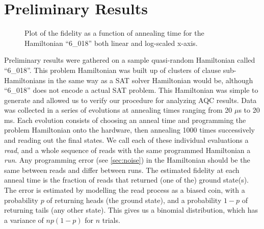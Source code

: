 \chapter{Preliminary Results}
\label{chap:prelim}

\begin{figure}
	\caption[Fidelity vs Time]{Plot of the fidelity as a function of annealing time for the Hamiltonian ``6\_018'' both linear and log-scaled x-axis.}
	\label{fig:fidelity}
\end{figure}

Preliminary results were gathered on a sample quasi-random Hamiltonian called ``6\_018''.  This problem Hamiltonian was built up of clusters of clause sub-Hamiltonians in the same way as a SAT solver Hamiltonian would be, although ``6\_018'' does not encode a actual SAT problem.  This Hamiltonian was simple to generate and allowed us to verify our procedure for analyzing AQC results.
Data was collected in a series of evolutions at annealing times ranging from 20 $\mu$s to 20 ms.  Each evolution consists of choosing an anneal time and programming the problem Hamiltonian onto the hardware, then annealing 1000 times successively and reading out the final states.  We call each of these individual evaluations a \emph{read}, and a whole sequence of reads with the same programmed Hamiltonian a \emph{run}.  Any programming error (see \ref{sec:noise}) in the Hamiltonian should be the same between reads and differ between runs.
The estimated fidelity at each anneal time is the fraction of reads that returned (one of the) ground state(s).  The error is estimated by modelling the read process as a biased coin, with a probability $p$ of returning heads (the ground state), and a probability $1-p$ of returning tails (any other state).  This gives us a binomial distribution, which has a variance of $np(1-p)$ for $n$ trials.  

